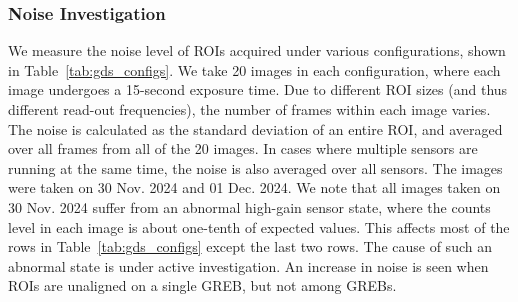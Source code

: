 \subsubsection{Noise Investigation}
We measure the noise level of ROIs acquired under various configurations, shown in Table~\ref{tab:gds_configs}. We take 20 images in each configuration, where each image undergoes a 15-second exposure time. Due to different ROI sizes (and thus different read-out frequencies), the number of frames within each image varies.  The noise is calculated as the standard deviation of an entire ROI, and averaged over all frames from all of the 20 images. In cases where multiple sensors are running at the same time, the noise is also averaged over all sensors. The images were taken on 30 Nov. 2024 and 01 Dec. 2024. We note that all images taken on 30 Nov. 2024 suffer from an abnormal high-gain sensor state, where the counts level in each image is about one-tenth of expected values. This affects most of the rows in Table~\ref{tab:gds_configs} except the last two rows. The cause of such an abnormal state is under active investigation. An increase in noise is seen when ROIs are unaligned on a single GREB, but not among GREBs.


